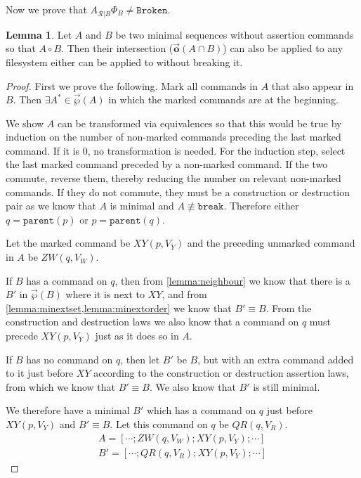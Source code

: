 \documentclass[12pt]{article}
\newcommand{\parent}{\mathtt{parent}}
\newcommand{\fsbroken}{\mathtt{Broken}} %
\newcommand{\FS}{\Phi} %
\newcommand{\cbrk}{\mathtt{break}}
\newcommand{\fscommand}[2]{{#1#2}}
\newcommand{\cxy}{\fscommand{X}{Y}}
\newcommand{\czw}{\fscommand{Z}{W}}
\newcommand{\cqr}{\fscommand{Q}{R}}
\newcommand{\nequiv}{\not\equiv}
\newcommand{\coworks}{\circ}
\newcommand{\orderset}[1]{\vec{\wp}({#1})}
\newcommand{\ordered}[1]{\vec{\mathbf{o}}({#1})}
\newcommand{\recchar}[3]{{#1}^{#3}_{\mathcal{R}|{#2}}}
\newcommand{\reca}{\recchar{A}{B}{}} %
\theoremstyle{definition}
\newtheorem{mylem}{Lemma}
\begin{document}
Now we prove that $\reca\FS_B\neq\fsbroken$.

\begin{mylem}
Let $A$ and $B$ be two minimal sequences without assertion commands so that $A\coworks B$.
Then their intersection ($\ordered{A\cap B}$) can also be applied to any filesystem
either can be applied to without breaking it.
\end{mylem}

\begin{proof}
First we prove the following.
Mark all commands in $A$ that also appear in $B$.
Then $\exists A^* \in \orderset{A}$ in which the marked commands are at the beginning.

\medskip

We show $A$ can be transformed via equivalences so that this would be true
by induction on the number of non-marked commands preceding the last marked command.
If it is 0, no transformation is needed.
For the induction step, select the last marked command preceded by a non-marked command.
If the two commute, reverse them, thereby reducing the number on relevant non-marked commands.
If they do not commute, they must be a construction or destruction pair as we know
that $A$ is minimal and $A\nequiv\cbrk$.
Therefore either $q=\parent(p)$ or $p=\parent(q)$.

Let the marked command be $\cxy(p, V_Y)$ and the preceding unmarked command in $A$ be $\czw(q, V_W)$.

If $B$ has a command on $q$, then
from \cref{lemma:neighbour}
we know that there is a $B'$ in $\orderset{B}$ where it is next to $\cxy$,
and from \cref{lemma:minextset,lemma:minextorder} we know that $B'\equiv B$.
From the construction and destruction laws we also know that a command on $q$
must precede $\cxy(p, V_Y)$ just as it does so in $A$.

If $B$ has no command on $q$, then let $B'$ be $B$, but with an extra command added to it just before $\cxy$
according to the construction or destruction assertion laws, from which we know
that $B'\equiv B$.
We also know that $B'$ is still minimal.

We therefore have a minimal $B'$ which has a command on $q$ just before $\cxy(p, V_Y)$ and $B'\equiv B$.
Let this command on $q$ be $\cqr(q, V_R)$.
\begin{gather*}
A = [\cdots; \czw(q, V_W); \cxy(p, V_Y); \cdots] \\
B' = [\cdots; \cqr(q, V_R); \cxy(p, V_Y); \cdots]
\end{gather*}


\end{proof}
\end{document}
